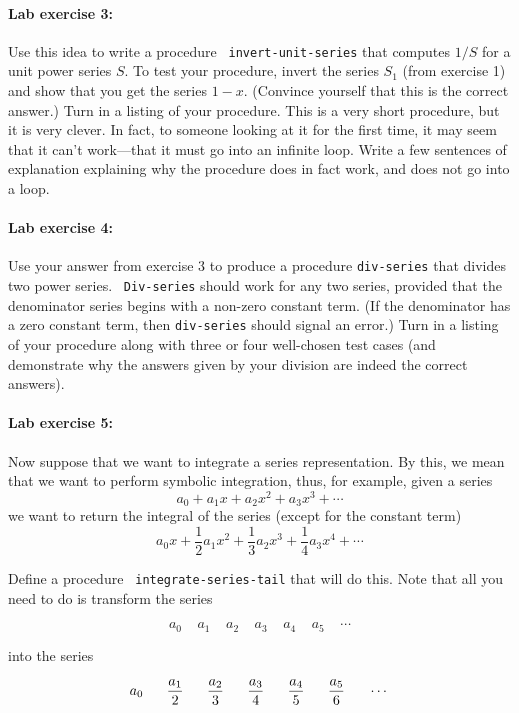 \paragraph{Lab exercise 3:} Use this idea to write a procedure {\tt
invert-unit-series} that computes $1/S$ for a unit power series $S$.
To test your procedure, invert the series $S_1$ (from exercise 1) and
show that you get the series $1-x$.  (Convince yourself that this is
the correct answer.)  Turn in a listing of your procedure.  This is a
very short procedure, but it is very clever.  In fact, to someone
looking at it for the first time, it may seem that it can't
work---that it must go into an infinite loop.  Write a few sentences
of explanation explaining why the procedure does in fact work, and
does not go into a loop.

\paragraph{Lab exercise 4:} Use your answer from exercise 3 to produce
a procedure {\tt div-series} that divides two power series.  {\tt
Div-series} should work for any two series, provided that the
denominator series begins with a non-zero constant term.  (If the
denominator has a zero constant term, then {\tt div-series} should
signal an error.)  Turn in a listing of your procedure along with
three or four well-chosen test cases (and demonstrate why the answers
given by your division are indeed the correct answers).

\paragraph{Lab exercise 5:}  Now suppose that we want to integrate a
series representation.  By this, we mean that we want to perform
symbolic integration, thus, for example,
given a series
\[ a_0 + a_1 x + a_2 x^2 + a_3 x^3 + \cdots \]
we want to return the integral of the series (except for the constant term)
\[ a_0 x + \frac{1}{2}a_1 x^2 + \frac{1}{3}a_2 x^3 + \frac{1}{4}a_3 x^4 + \cdots \]

Define a procedure {\tt
integrate-series-tail} that will do this.   Note that all you need to
do is transform the series

\[ a_0 \ \ \ \ \  a_1 \ \ \ \ \  a_2  \ \ \ \ \  a_3  \ \ \ \ \   a_4  \ \ \ \ \   a_5  \ \ \ \ \  \cdots \]

into the series

\[ a_0 \ \ \ \ \  {a_1 \over 2} \ \ \ \ \  {a_2 \over 3}  \ \ \ \ \
{a_3 \over 4}  \ \ \ \ \
{a_4 \over 5}  \ \ \ \ \
{a_5 \over 6}  \ \ \ \ \  \cdots \]

